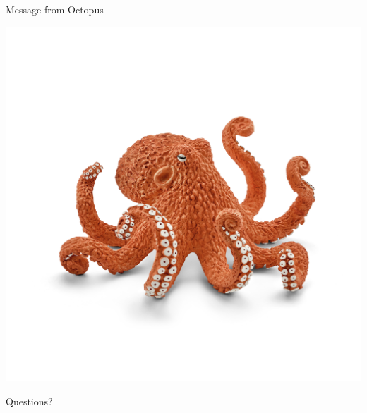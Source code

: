 \documentclass[xcolor={table,dvipsnames,usenames}]{beamer}
\begin{document}
\begin{frame}{Message from Octopus}
\begin{minipage}[t]{0.3\textwidth}
	\begin{center}
		\includegraphics[width=\columnwidth]{figures/octopus.jpg}
	\end{center}
\end{minipage}
\begin{minipage}[t]{0.6\textwidth}
	\begin{center}
		{\Huge Questions?}
	\end{center}
\end{minipage}
		
\end{frame}
\end{document}
